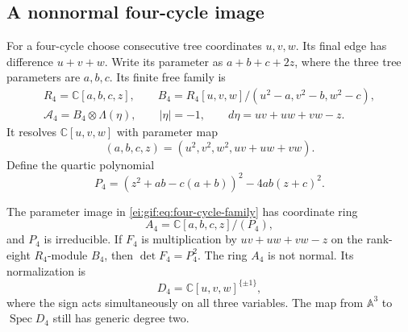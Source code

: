 \subsection{A nonnormal four-cycle image}

For a four-cycle choose consecutive tree coordinates
$u,v,w$. Its final edge has difference $u+v+w$.
Write its parameter as $a+b+c+2z$, where the three
tree parameters are $a,b,c$. Its finite free family is
\begin{equation}\label{ei:gif:eq:four-cycle-family}
 \begin{gathered}
 R_4=\mathbb C[a,b,c,z],\qquad
 B_4=R_4[u,v,w]/(u^2-a,v^2-b,w^2-c),\\
 \mathcal A_4=B_4\otimes\Lambda(\eta),\qquad
 |\eta|=-1,\qquad d\eta=uv+uw+vw-z.
 \end{gathered}
\end{equation}
It resolves $\mathbb C[u,v,w]$ with parameter map
\[
 (a,b,c,z)=(u^2,v^2,w^2,uv+uw+vw).
\]
Define the quartic polynomial
\begin{equation}\label{ei:gif:eq:quartic}
 P_4=(z^2+ab-c(a+b))^2-4ab(z+c)^2.
\end{equation}

\begin{theorem}\label{ei:gif:thm:four-cycle-normalization}
The parameter image in \eqref{ei:gif:eq:four-cycle-family}
has coordinate ring
\[
 A_4=\mathbb C[a,b,c,z]/(P_4),
\]
and $P_4$ is irreducible. If $F_4$ is multiplication
by $uv+uw+vw-z$ on the rank-eight $R_4$-module $B_4$,
then $\det F_4=P_4^2$.
The ring $A_4$ is not normal. Its normalization is
\begin{equation}\label{ei:gif:eq:normalization}
 D_4=\mathbb C[u,v,w]^{\{\pm1\}},
\end{equation}
where the sign acts simultaneously on all three
variables. The map from $\mathbb A^3$ to
$\operatorname{Spec}D_4$ still has generic degree two.
\end{theorem}

